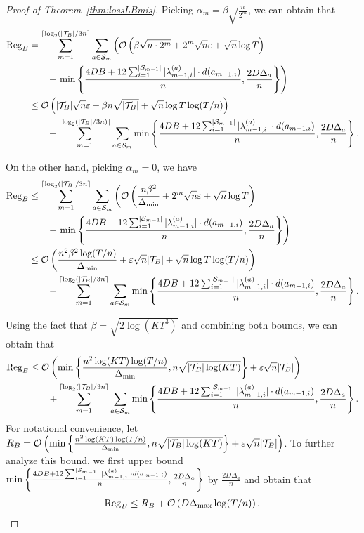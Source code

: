 \begin{proof}[Proof of Theorem~\ref{thm:lossLBmis}]
    Picking $\alpha_m = \beta\sqrt{\frac{n}{2^m}}$, we can obtain that
    \begin{align*}
        {\mathrm{Reg}}_B &=\sum_{m= 1}^{\lceil\log_2(|{\mathcal{T}}_B|/3n\rceil}\sum_{a\in {\mathcal{S}}_m}\left(\mathcal{O}\left(\beta\sqrt{n\cdot 2^m} +2^m\sqrt{n}\varepsilon+ \sqrt{n}\log T \right) \right.\\
        &\qquad +\left.\min\left\{\frac{4DB+12\sum_{i=1}^{|{\mathcal{S}}_{m-1}|}|\lambda_{m-1,i}^{(a)}|\cdot d(a_{m-1,i})}{n}, \frac{2D\Delta_a}{n}\right\}\right) \\
        &\leq \mathcal{O}\left(|{\mathcal{T}}_B|\sqrt{n}\varepsilon + \beta n\sqrt{|{\mathcal{T}}_B|}+\sqrt{n}\log T\log(T/n)\right) \\
        &\qquad + \sum_{m= 1}^{\lceil\log_2(|{\mathcal{T}}_B|/3n)\rceil}\sum_{a\in {\mathcal{S}}_m}\min\left\{\frac{4DB+12\sum_{i=1}^{|{\mathcal{S}}_{m-1}|}|\lambda_{m-1,i}^{(a)}|\cdot d(a_{m-1,i})}{n}, \frac{2D\Delta_a}{n}\right\}.
    \end{align*}
    
    On the other hand, picking $\alpha_m=0$, we have
    \begin{align*}
        {\mathrm{Reg}}_B &\leq \sum_{m=1}^{\lceil\log_2(|{\mathcal{T}}_B|/3n\rceil}\sum_{a\in {\mathcal{S}}_m}\left(\mathcal{O}\left(\frac{n\beta^2}{\Delta_{\min}} + 2^m\sqrt{n}\varepsilon + \sqrt{n}\log T\right) \right.\\
        &\qquad +\left.\min\left\{\frac{4DB+12\sum_{i=1}^{|{\mathcal{S}}_{m-1}|}|\lambda_{m-1,i}^{(a)}|\cdot d(a_{m-1,i})}{n}, \frac{2D\Delta_a}{n}\right\}\right) \\
        &\leq \mathcal{O}\left(\frac{n^2\beta^2\log(T/n)}{\Delta_{\min}}+\varepsilon\sqrt{n}|{\mathcal{T}}_B|+\sqrt{n}\log T\log(T/n)\right)\\
        &\qquad + \sum_{m= 1}^{\lceil\log_2(|{\mathcal{T}}_B|/3n\rceil}\sum_{a\in {\mathcal{S}}_m} \min\left\{\frac{4DB+12\sum_{i=1}^{|{\mathcal{S}}_{m-1}|}|\lambda_{m-1,i}^{(a)}|\cdot d(a_{m-1,i})}{n}, \frac{2D\Delta_a}{n}\right\}.
    \end{align*}

    Using the fact that $\beta=\sqrt{2\log(KT^3)}$ and combining both bounds, we can obtain that
    \begin{align}
        \Reg_B &\leq \order\left(\min\left\{\frac{n^2\log(KT)\log(T/n)}{\Delta_{\min}}, n\sqrt{|\calT_B|\log(KT)}\right\}+\epsilon\sqrt{n}|\calT_B|\right)\nonumber\\
        &\qquad + \sum_{m= 1}^{\lceil\log_2(|\calT_B|/3n\rceil}\sum_{a\in \calS_m}\min\left\{\frac{4DB+12\sum_{i=1}^{|\calS_{m-1}|}|\lambda_{m-1,i}^{(a)}|\cdot d(a_{m-1,i})}{n}, \frac{2D\Delta_a}{n}\right\}. \label{eqn:reg_b}%
    \end{align}
    For notational convenience, let $R_B=\mathcal{O}\left(\min\left\{\frac{n^2\log(KT)\log(T/n)}{\Delta_{\min}},n\sqrt{|{\mathcal{T}}_B|\log(KT)}\right\}+\varepsilon\sqrt{n}|{\mathcal{T}}_B|\right)$. To further analyze this bound, we first upper bound $\min\left\{\frac{4DB+12\sum_{i=1}^{|{\mathcal{S}}_{m-1}|}|\lambda_{m-1,i}^{(a)}|\cdot d(a_{m-1,i})}{n}, \frac{2D\Delta_a}{n}\right\}$ by $\frac{2D\Delta_a}{n}$ and obtain that
    \begin{align}\label{eqn:reg_B_1}
        {\mathrm{Reg}}_B \leq R_B + \mathcal{O}\left(D\Delta_{\max}\log(T/n)\right).
    \end{align}


\end{proof}
